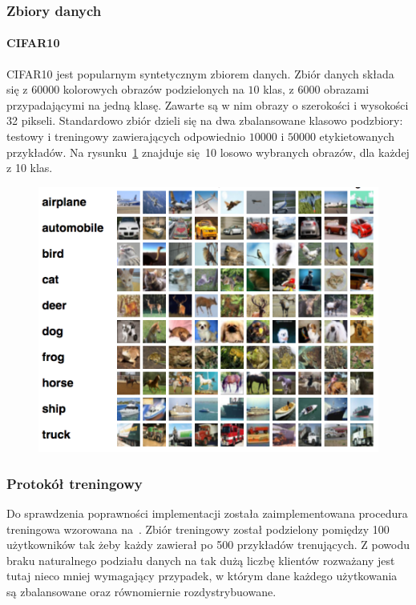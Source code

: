   \subsubsection{Zbiory danych}
  \paragraph{CIFAR10}
  CIFAR10 jest popularnym syntetycznym zbiorem danych. Zbiór danych składa się z \(\num{60000}\)
  kolorowych obrazów podzielonych na \(\num{10}\) klas, z \(\num{6000}\) obrazami przypadającymi
  na jedną klasę. Zawarte są w nim obrazy o szerokości i wysokości 32 pikseli. Standardowo zbiór
  dzieli się na dwa zbalansowane klasowo podzbiory: testowy i treningowy zawierających odpowiednio
  \(10000\) i \(50000\) etykietowanych przykładów. Na rysunku~\ref{fig:cifar10_example} znajduje się 10 losowo wybranych obrazów, dla każdej z 10 klas.

  \begin{figure}[h]
    \centering
    \includegraphics[width=1.0\textwidth]{img/cifar10_example.png}
    \label{fig:cifar10_example}
  \end{figure}

  \subsubsection{Protokół treningowy}

  Do sprawdzenia poprawności implementacji została zaimplementowana procedura treningowa wzorowana
  na~\cite{mcmahan2016communicationefficient}. Zbiór treningowy został podzielony pomiędzy 100 użytkowników tak żeby każdy zawierał po 500 przykładów trenujących. Z powodu braku naturalnego podziału danych na tak dużą liczbę klientów rozważany jest tutaj nieco mniej wymagający przypadek, w którym dane każdego użytkowania są zbalansowane oraz równomiernie rozdystrybuowane.

